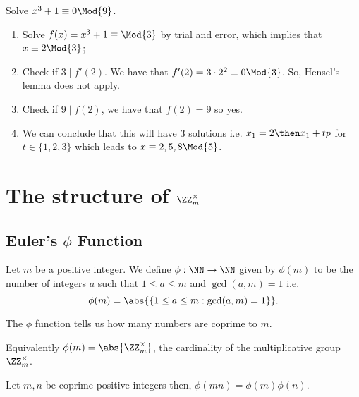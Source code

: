\documentclass[12pt, a4paper]{article}
\begin{document}
\begin{example}
    Solve \(x^3+1 \equiv 0 \Mod{9}\).
    \begin{enumerate}
        \item Solve \(f(x)=x^3 +1 \equiv \Mod{3}\) by trial and error, which implies that \(x \equiv 2 \Mod{3}\);
        \item Check if \(3 \mid f'(2)\). We have that \(f'(2)=3\cdot 2^2 \equiv 0 \Mod{3}\). So, Hensel's lemma does not apply.
        \item Check if \(9 \mid f(2)\), we have that \(f(2) =9 \) so yes.
        \item We can conclude that this will have \(3\) solutions i.e. \(x_1=2 \then x_1+tp\) for \(t \in \{1,2,3\}\) which leads to \(x \equiv 2,5,8 \Mod{5}\).
    \end{enumerate}
\end{example}

\section{The structure of \texorpdfstring{\(\ZZ_m^{\times}\)}{TEXT}}

\subsection{Euler's \texorpdfstring{\(\phi\)}{TEXT} Function}

\begin{definition}
    Let \(m\) be a positive integer. We define \(\phi : \NN\to \NN\) given by \(\phi(m)\) to be the number of integers \(a\) such that \(1\leq a \leq m\) and \(\gcd(a,m)=1\) i.e. 
    \[\phi(m) = \abs{\left\{ 1 \leq a \leq m : \gcd(a,m)=1 \right\}}.\]
\end{definition}

\begin{mdnote}
    The \(\phi\) function tells us how many numbers are coprime to \(m\).
\end{mdnote}

\begin{theorem}
    Equivalently \(\phi(m)=\abs{\ZZ^{\times}_m}\), the cardinality of the multiplicative group \(\ZZ^{\times}_m\).
\end{theorem}

\begin{lemma}
    Let \(m,n\) be coprime positive integers then, \(\phi(mn)=\phi(m)\phi(n)\).
\end{lemma}
\end{document}
